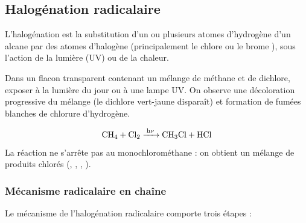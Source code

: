 \subsection{Halogénation radicalaire}

\begin{definition}[Halogénation]
L'halogénation est la substitution d'un ou plusieurs atomes d'hydrogène d'un alcane par des atomes d'halogène (principalement le chlore  ou le brome ), sous l'action de la lumière (UV) ou de la chaleur.
\end{definition}

\begin{experience}
Dans un flacon transparent contenant un mélange de méthane et de dichlore, exposer à la lumière du jour ou à une lampe UV. On observe une décoloration progressive du mélange (le dichlore vert-jaune disparaît) et formation de fumées blanches de chlorure d'hydrogène.
\end{experience}

\begin{propriete}
\[
\ce{CH4 + Cl2 ->[h\nu] CH3Cl + HCl}
\]
La réaction ne s'arrête pas au monochlorométhane : on obtient un mélange de produits chlorés (, , , ).
\end{propriete}

\subsubsection{Mécanisme radicalaire en chaîne}

Le mécanisme de l'halogénation radicalaire comporte trois étapes :

